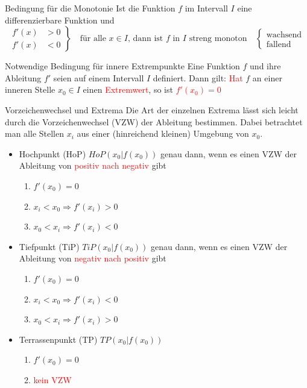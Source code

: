 \begin{satz}{Bedingung für die Monotonie}{}
 Ist die Funktion $f$ im Intervall $I$ eine differenzierbare Funktion und 
  \begin{equation*}
	\left.\begin{aligned}
	f'(x) &>0  \\
	f'(x) &<0
	\end{aligned}
	\right\}
\quad \text{für alle $x\in I$, dann ist $f$ in $I$ streng monoton}
	\quad\left\{\begin{aligned}
	\text{wachsend}  \\
	\text{fallend}
	\end{aligned}
\right.
\end{equation*} 
 \end{satz}
 \begin{satz}{Notwendige Bedingung für innere Extrempunkte}{}
   Eine Funktion $f$ und ihre Ableitung $f'$ seien auf einem Intervall $I$ definiert. Dann gilt: \textcolor{red}{Hat} $f$ an einer inneren Stelle $x_0\in I$ einen \textcolor{red}{Extremwert}, so ist \textcolor{red}{$f'(x_0)=0$}
 \end{satz}
 \begin{b8d}{Vorzeichenwechsel und Extrema}{}
 Die Art der einzelnen Extrema lässt sich leicht durch die Vorzeichenwechsel (VZW) der Ableitung bestimmen. Dabei betrachtet man alle Stellen $x_i$ aus einer (hinreichend kleinen) Umgebung von $x_0$.
 \begin{itemize}
\item Hochpunkt (HoP) $HoP(x_0|f(x_0))$ genau dann, wenn es einen VZW der Ableitung von \textcolor{red}{positiv nach negativ} gibt
\begin{enumerate}
    \item $f'(x_0) = 0$
    \item $x_i<x_0 \Rightarrow f'(x_i)>0$
    \item $x_0 <x_i \Rightarrow f'(x_i)<0$
\end{enumerate}
\item Tiefpunkt (TiP) $TiP(x_0|f(x_0))$ genau dann, wenn es einen VZW der Ableitung von \textcolor{red}{negativ nach positiv} gibt
\begin{enumerate}
    \item $f'(x_0) = 0$
    \item $x_i<x_0 \Rightarrow f'(x_i)<0$
    \item $x_0 <x_i \Rightarrow f'(x_i)>0$
\end{enumerate}
\item Terrassenpunkt (TP) $TP(x_0|f(x_0))$
\begin{enumerate}
    \item $f'(x_0) = 0$
    \item \textcolor{red}{kein VZW}
\end{enumerate}
 \end{itemize}
 \end{b8d}
